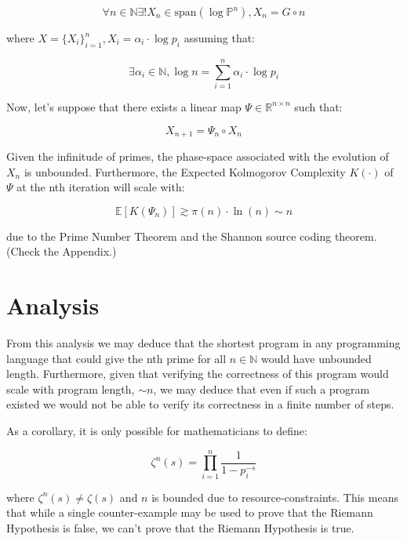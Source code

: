 \documentclass{article}
\begin{document}
\begin{equation}
\forall n \in \mathbb{N} \exists! X_n \in \text{span}(\log \mathbb{P}^n), X_n = G \circ n
\end{equation}

where $X = \{X_i\}_{i=1}^n, X_i = \alpha_i \cdot \log p_i$ assuming that:

\begin{equation}
\exists \alpha_i \in \mathbb{N}, \log n = \sum_{i=1}^n \alpha_i \cdot \log p_i
\end{equation}

Now, let's suppose that there exists a linear map $\Psi \in \mathbb{R}^{n \times n}$ such that:

\begin{equation}
X_{n+1} = \Psi_n \circ X_n
\end{equation}

Given the infinitude of primes, the phase-space associated with the evolution of $X_n$ is unbounded. Furthermore, the Expected Kolmogorov Complexity $K(\cdot)$ of $\Psi$ at the nth iteration will scale with:

\begin{equation}
\mathbb{E}[K(\Psi_n)] \gtrsim \pi(n) \cdot \ln(n) \sim n
\end{equation}

due to the Prime Number Theorem and the Shannon source coding theorem. (Check the Appendix.)

\newpage

\section{Analysis}

From this analysis we may deduce that the shortest program in any programming language that could give the nth prime for all $n \in \mathbb{N}$ would have unbounded length. Furthermore, given that verifying the correctness of this program would scale with program length, $ \sim n$, we may deduce that even if such a program existed we would not be able to verify its correctness in a finite number of steps. 

As a corollary, it is only possible for mathematicians to define:

\begin{equation}
\zeta^n(s) = \prod_{i=1}^n \frac{1}{1-p_i^{-s}}
\end{equation}

where $\zeta^n(s) \neq \zeta(s)$ and $n$ is bounded due to resource-constraints. This means that while a single counter-example may be used to prove that the Riemann Hypothesis is false, we can’t prove that the Riemann Hypothesis is true.
\end{document}
